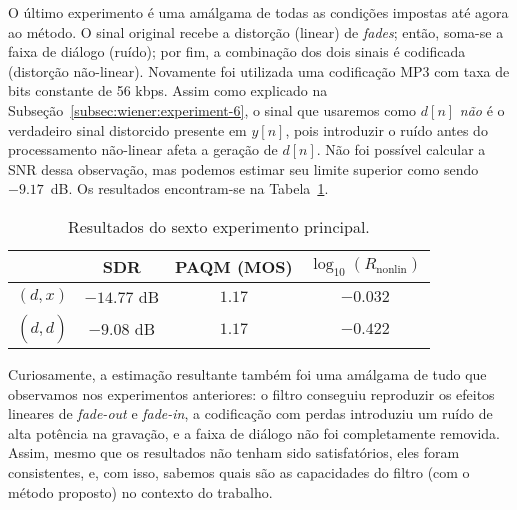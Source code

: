 O último experimento é uma amálgama de todas as condições impostas até agora ao método.
O sinal original recebe a distorção (linear) de \textit{fades}; então, soma-se a faixa
de diálogo (ruído); por fim, a combinação dos dois sinais é codificada (distorção
não-linear). Novamente foi utilizada uma codificação MP3 com taxa de bits constante de
56 kbps. Assim como explicado na Subseção~\ref{subsec:wiener:experiment-6}, o sinal que
usaremos como $d[n]$ \emph{não} é o verdadeiro sinal distorcido presente em $y[n]$,
pois introduzir o ruído antes do processamento não-linear afeta a geração de $d[n]$.
Não foi possível calcular a SNR dessa observação, mas podemos estimar seu limite
superior como sendo $-9.17$~dB. Os resultados encontram-se na
Tabela~\ref{tab:correntropy:experiment-6}. {\def\arraystretch{1.25}\tabcolsep=10pt
\begin{table}[!ht]
	\centering
	\caption[Resultados do sexto experimento: \textit{fades} com ruído aditivo e codificação com perdas]{Resultados do sexto experimento principal.}
	\label{tab:correntropy:experiment-6}
	\begin{tabular}{cccc}
		\toprule
		               & SDR         & PAQM (MOS) & $\log_{10}(R_{\text{nonlin}})$ \\
		\midrule
		$(d, x)$       & $-14.77$ dB & $1.17$     & $-0.032$                       \\
		$(d, \hat{d})$ & $-9.08$ dB  & $1.17$     & $-0.422$                       \\ \bottomrule
	\end{tabular}
\end{table}
}

Curiosamente, a estimação resultante também foi uma amálgama de tudo que observamos nos
experimentos anteriores: o filtro conseguiu reproduzir os efeitos lineares de
\textit{fade-out} e \textit{fade-in}, a codificação com perdas introduziu um ruído de
alta potência na gravação, e a faixa de diálogo não foi completamente removida. Assim,
mesmo que os resultados não tenham sido satisfatórios, eles foram consistentes, e, com
isso, sabemos quais são as capacidades do filtro (com o método proposto) no contexto do
trabalho.
